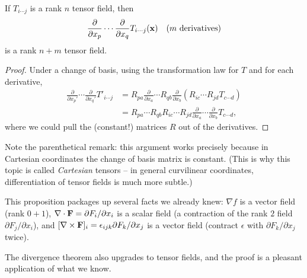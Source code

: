 \documentclass[a4paper]{scrartcl}
\begin{document}
\begin{proposition}
	If $T_{i \cdots j}$ is a rank $n$ tensor field, then
	$$
	\frac{\partial}{\partial x_p} \cdots \frac{\partial}{\partial x_q} T_{i\cdots j}(\mathbf{x}) \quad (m \text{ derivatives})
	$$
	is a rank $n + m$ tensor field.
\end{proposition}
\begin{proof}
	Under a change of basis, using the transformation law for $T$ and for each derivative,
	\begin{align*}
		\frac{\partial}{\partial x_p'} \cdots \frac{\partial}{\partial x_q'} T'_{i \cdots j} &= R_{pa}\frac{\partial}{\partial x_a} \cdots R_{qb} \frac{\partial}{\partial x_b} \left(R_{ic} \cdots R_{jd} T_{c \cdots d}\right) \\
		&= R_{pa}\cdots R_{qb} R_{ic}\cdots R_{jd} \frac{\partial}{\partial x_a}\cdots\frac{\partial}{\partial x_b}T_{c\cdots d},
	\end{align*}
	where we could pull the (constant!) matrices $R$ out of the derivatives.
\end{proof}

Note the parenthetical remark: this argument works precisely because in Cartesian coordinates the change of basis matrix is constant. (This is why this topic is called \emph{Cartesian} tensors -- in general curvilinear coordinates, differentiation of tensor fields is much more subtle.)

This proposition packages up several facts we already knew: $\nabla f$ is a vector field (rank $0 + 1$), $\nabla \cdot \mathbf{F} = \partial F_i/\partial x_i$ is a scalar field (a contraction of the rank $2$ field $\partial F_j / \partial x_i$), and $[\nabla \times \mathbf{F}]_i = \epsilon_{ijk}\partial F_k/\partial x_j$ is a vector field (contract $\epsilon$ with $\partial F_k/\partial x_j$ twice).

The divergence theorem also upgrades to tensor fields, and the proof is a pleasant application of what we know.
\end{document}
